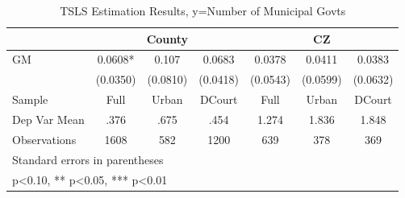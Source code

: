\begin{table}[htbp]\centering
\def\sym#1{\ifmmode^{#1}\else\(^{#1}\)\fi}
\caption{TSLS Estimation Results, y=Number of Municipal Govts}
\begin{tabular}{l*{6}{c}}
\toprule
                &\multicolumn{3}{c}{County}            &\multicolumn{3}{c}{CZ}                \\\cmidrule(lr){2-4}\cmidrule(lr){5-7}
\midrule
GM              &   0.0608*  &    0.107   &   0.0683   &   0.0378   &   0.0411   &   0.0383   \\
                & (0.0350)   & (0.0810)   & (0.0418)   & (0.0543)   & (0.0599)   & (0.0632)   \\
\midrule
Sample          &     Full   &    Urban   &   DCourt   &     Full   &    Urban   &   DCourt   \\
Dep Var Mean    &     .376   &     .675   &     .454   &    1.274   &    1.836   &    1.848   \\
Observations    &     1608   &      582   &     1200   &      639   &      378   &      369   \\
\bottomrule
\multicolumn{7}{l}{\footnotesize Standard errors in parentheses}\\
\multicolumn{7}{l}{\footnotesize * p<0.10, ** p<0.05, *** p<0.01}\\
\end{tabular}
\end{table}
